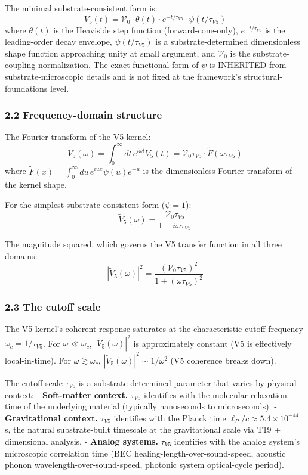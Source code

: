 \documentclass[
  11pt,
  a4paperpaper,
]{article}
\begin{document}
The minimal substrate-consistent form is:
\[V_5(t) = \mathcal{V}_0 \cdot \theta(t) \cdot e^{-t/\tau_{V5}} \cdot \psi(t/\tau_{V5})\]
where \(\theta(t)\) is the Heaviside step function (forward-cone-only),
\(e^{-t/\tau_{V5}}\) is the leading-order decay envelope,
\(\psi(t/\tau_{V5})\) is a substrate-determined dimensionless shape
function approaching unity at small argument, and \(\mathcal{V}_0\) is
the substrate-coupling normalization. The exact functional form of
\(\psi\) is INHERITED from substrate-microscopic details and is not
fixed at the framework's structural-foundations level.

\subsubsection{2.2 Frequency-domain
structure}\label{frequency-domain-structure}

The Fourier transform of the V5 kernel:
\[\tilde V_5(\omega) = \int_0^\infty dt \, e^{i\omega t} V_5(t) = \mathcal{V}_0 \tau_{V5} \cdot \tilde F(\omega \tau_{V5})\]
where \(\tilde F(x) = \int_0^\infty du \, e^{iux} \psi(u) e^{-u}\) is
the dimensionless Fourier transform of the kernel shape.

For the simplest substrate-consistent form (\(\psi = 1\)):
\[\tilde V_5(\omega) = \frac{\mathcal{V}_0 \tau_{V5}}{1 - i\omega\tau_{V5}}\]

The magnitude squared, which governs the V5 transfer function in all
three domains:
\[|\tilde V_5(\omega)|^2 = \frac{(\mathcal{V}_0 \tau_{V5})^2}{1 + (\omega\tau_{V5})^2}\]

\subsubsection{2.3 The cutoff scale}\label{the-cutoff-scale}

The V5 kernel's coherent response saturates at the characteristic cutoff
frequency \(\omega_c = 1/\tau_{V5}\). For \(\omega \ll \omega_c\),
\(|\tilde V_5(\omega)|^2\) is approximately constant (V5 is effectively
local-in-time). For \(\omega \gtrsim \omega_c\),
\(|\tilde V_5(\omega)|^2 \sim 1/\omega^2\) (V5 coherence breaks down).

The cutoff scale \(\tau_{V5}\) is a substrate-determined parameter that
varies by physical context: - \textbf{Soft-matter context.}
\(\tau_{V5}\) identifies with the molecular relaxation time of the
underlying material (typically nanoseconds to microseconds). -
\textbf{Gravitational context.} \(\tau_{V5}\) identifies with the Planck
time \(\ell_P/c \approx 5.4 \times 10^{-44}\) s, the natural
substrate-built timescale at the gravitational scale via T19 +
dimensional analysis. - \textbf{Analog systems.} \(\tau_{V5}\)
identifies with the analog system's microscopic correlation time (BEC
healing-length-over-sound-speed, acoustic phonon
wavelength-over-sound-speed, photonic system optical-cycle period).
\end{document}
